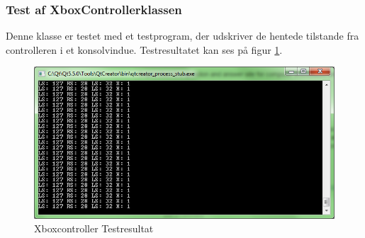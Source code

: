 

\subsubsection{Test af XboxControllerklassen}
Denne klasse er testet med et testprogram, der udskriver de hentede tilstande fra controlleren i et konsolvindue. Testresultatet kan ses på figur \ref{fig:xboxcontroller_test}.

\begin{figure}[h!]
\centering
\includegraphics[width=\textwidth* 3/4]{../fig/billeder/xboxcontroller_test.png}
\caption{Xboxcontroller Testresultat}
\label{fig:xboxcontroller_test}
\end{figure}

\clearpage